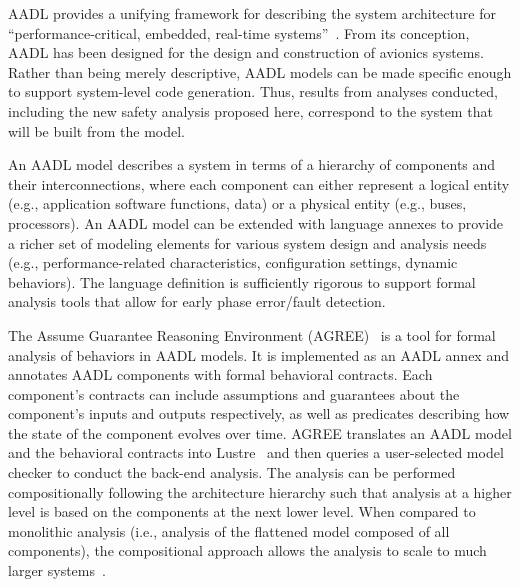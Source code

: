 \label{subsec:aadl-agree}
AADL provides a unifying framework for describing the system architecture for ``performance-critical, embedded, real-time systems''~\cite{AADL_Standard}. From its conception, AADL has been designed for the design and construction of avionics systems.  
Rather than being merely descriptive, AADL models can be made specific enough to support system-level code generation.  Thus, results from analyses conducted, including the new safety analysis proposed here, correspond to the system that will be built from the model.  

An AADL model describes a system in terms of a hierarchy of components and their interconnections, where each component can either represent a logical entity (e.g., application software functions, data) or a physical entity (e.g., buses, processors). An AADL model can be extended with language annexes to provide a richer set of modeling elements for various system design and analysis needs (e.g., performance-related characteristics, configuration settings, dynamic behaviors). The language definition is sufficiently rigorous to support formal analysis tools that allow for early phase error/fault detection.

The Assume Guarantee Reasoning Environment (AGREE)~\cite{NFM2012:CoGaMiWhLaLu} is a tool for formal analysis of behaviors in AADL models.  It is implemented as an AADL annex and annotates AADL components with formal behavioral contracts. Each component's contracts can include assumptions and guarantees about the component's inputs and outputs respectively, as well as predicates describing how the state of the component evolves over time. AGREE translates an AADL model and the behavioral contracts into Lustre~\cite{Halbwachs91:IEEE} and then queries a user-selected
model checker to conduct the back-end analysis. The analysis %
can be performed compositionally following the architecture hierarchy such that analysis at a higher level is based on the components at the next lower level.  When compared to monolithic analysis (i.e., analysis of the flattened model composed of all components), the compositional approach allows the analysis to scale to much larger systems~\cite{NFM2012:CoGaMiWhLaLu}. 

